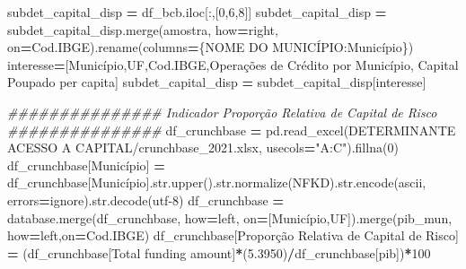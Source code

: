 \documentclass[
  12,
  dvipsnames]{article}
\newenvironment{Shaded}{\begin{snugshade}}{\end{snugshade}}
\newcommand{\BuiltInTok}[1]{#1}
\newcommand{\CommentTok}[1]{\textcolor[rgb]{0.56,0.35,0.01}{\textit{#1}}}
\newcommand{\DecValTok}[1]{\textcolor[rgb]{0.00,0.00,0.81}{#1}}
\newcommand{\FloatTok}[1]{\textcolor[rgb]{0.00,0.00,0.81}{#1}}
\newcommand{\NormalTok}[1]{#1}
\newcommand{\OperatorTok}[1]{\textcolor[rgb]{0.81,0.36,0.00}{\textbf{#1}}}
\newcommand{\StringTok}[1]{\textcolor[rgb]{0.31,0.60,0.02}{#1}}
\begin{document}
\begin{Shaded}
\begin{Highlighting}[]
\NormalTok{subdet\_capital\_disp }\OperatorTok{=}\NormalTok{ df\_bcb.iloc[:,[}\DecValTok{0}\NormalTok{,}\DecValTok{6}\NormalTok{,}\DecValTok{8}\NormalTok{]]}
\NormalTok{subdet\_capital\_disp }\OperatorTok{=}\NormalTok{ subdet\_capital\_disp.merge(amostra, how}\OperatorTok{=}\StringTok{\textquotesingle{}right\textquotesingle{}}\NormalTok{, on}\OperatorTok{=}\StringTok{\textquotesingle{}Cod.IBGE\textquotesingle{}}\NormalTok{).rename(columns}\OperatorTok{=}\NormalTok{\{}\StringTok{\textquotesingle{}NOME DO MUNICÍPIO\textquotesingle{}}\NormalTok{:}\StringTok{\textquotesingle{}Município\textquotesingle{}}\NormalTok{\})}
\NormalTok{interesse}\OperatorTok{=}\NormalTok{[}\StringTok{\textquotesingle{}Município\textquotesingle{}}\NormalTok{,}\StringTok{\textquotesingle{}UF\textquotesingle{}}\NormalTok{,}\StringTok{\textquotesingle{}Cod.IBGE\textquotesingle{}}\NormalTok{,}\StringTok{\textquotesingle{}Operações de Crédito por Município\textquotesingle{}}\NormalTok{,}
           \StringTok{\textquotesingle{}Capital Poupado per capita\textquotesingle{}}\NormalTok{]}
\NormalTok{subdet\_capital\_disp }\OperatorTok{=}\NormalTok{ subdet\_capital\_disp[interesse]}

\CommentTok{\#\#\#\#\#\#\#\#\#\#\#\#\#\#\# Indicador Proporção Relativa de Capital de Risco \#\#\#\#\#\#\#\#\#\#\#\#\#\#\#}
\NormalTok{df\_crunchbase }\OperatorTok{=}\NormalTok{ pd.read\_excel(}\StringTok{\textquotesingle{}DETERMINANTE ACESSO A CAPITAL/crunchbase\_2021.xlsx\textquotesingle{}}\NormalTok{, usecols}\OperatorTok{=}\StringTok{"A:C"}\NormalTok{).fillna(}\DecValTok{0}\NormalTok{)}
\NormalTok{df\_crunchbase[}\StringTok{\textquotesingle{}Município\textquotesingle{}}\NormalTok{] }\OperatorTok{=}\NormalTok{ df\_crunchbase[}\StringTok{\textquotesingle{}Município\textquotesingle{}}\NormalTok{].}\BuiltInTok{str}\NormalTok{.upper().}\BuiltInTok{str}\NormalTok{.normalize(}\StringTok{\textquotesingle{}NFKD\textquotesingle{}}\NormalTok{).}\BuiltInTok{str}\NormalTok{.encode(}\StringTok{\textquotesingle{}ascii\textquotesingle{}}\NormalTok{, errors}\OperatorTok{=}\StringTok{\textquotesingle{}ignore\textquotesingle{}}\NormalTok{).}\BuiltInTok{str}\NormalTok{.decode(}\StringTok{\textquotesingle{}utf{-}8\textquotesingle{}}\NormalTok{)}
\NormalTok{df\_crunchbase }\OperatorTok{=}\NormalTok{ database.merge(df\_crunchbase, how}\OperatorTok{=}\StringTok{\textquotesingle{}left\textquotesingle{}}\NormalTok{, on}\OperatorTok{=}\NormalTok{[}\StringTok{\textquotesingle{}Município\textquotesingle{}}\NormalTok{,}\StringTok{\textquotesingle{}UF\textquotesingle{}}\NormalTok{]).merge(pib\_mun, how}\OperatorTok{=}\StringTok{\textquotesingle{}left\textquotesingle{}}\NormalTok{,on}\OperatorTok{=}\StringTok{\textquotesingle{}Cod.IBGE\textquotesingle{}}\NormalTok{)}
\NormalTok{df\_crunchbase[}\StringTok{\textquotesingle{}Proporção Relativa de Capital de Risco\textquotesingle{}}\NormalTok{] }\OperatorTok{=}\NormalTok{ (df\_crunchbase[}\StringTok{\textquotesingle{}Total funding amount\textquotesingle{}}\NormalTok{]}\OperatorTok{*}\NormalTok{(}\FloatTok{5.3950}\NormalTok{)}\OperatorTok{/}\NormalTok{df\_crunchbase[}\StringTok{\textquotesingle{}pib\textquotesingle{}}\NormalTok{])}\OperatorTok{*}\DecValTok{100}


\end{Highlighting}
\end{Shaded}
\end{document}
